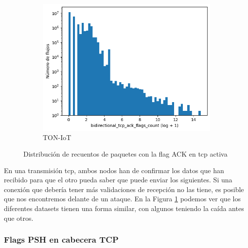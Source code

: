 \begin{figure}[H]
    \begin{subfigure}[b]{0.32\textwidth}
        \centering
        \includegraphics[width=\linewidth]{media/packet_pincer_toniot/bidirectional_tcp_ack_flags_count_log_x_log_y.png}
        \caption{TON-IoT}
    \end{subfigure}
       \caption{Distribución de recuentos de paquetes con la flag ACK en \acrshort{tcp} activa}
       \label{fig:packet_pincer_bidirectional_tcp_ack_flags_count}
\end{figure}

En una transmisión \acrshort{tcp}, ambos nodos han de confirmar los datos que han recibido para que el otro pueda saber que puede enviar los siguientes. Si una conexión que debería tener más validaciones de recepción no las tiene, es posible que nos encontremos delante de un ataque. En la Figura \ref{fig:packet_pincer_bidirectional_tcp_ack_flags_count} podemos ver que los diferentes datasets tienen una forma similar, con algunos teniendo la caída antes que otros.

\subsubsection{Flags PSH en cabecera TCP}

